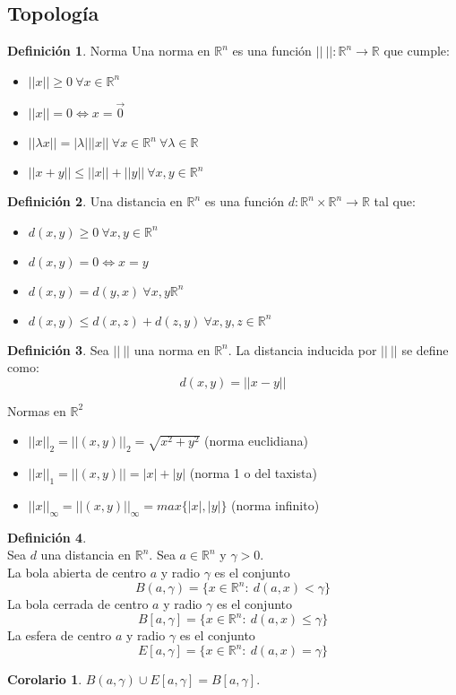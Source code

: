 \documentclass[10pt]{article}
\theoremstyle{definition}
\newtheorem{definition}{Definición}[section]
\newtheorem{corollary}{Corolario}[theorem]
\begin{document}
\subsection{Topología}
\begin{definition}{Norma}
	Una norma en $\mathbb{R}^n$ es una función $||\ ||:\mathbb{R}^n\to\mathbb{R}$ que cumple:
	\begin{itemize}
		\item $||x||\ge 0\ \forall x\in\mathbb{R}^n$
		\item $||x||=0\Leftrightarrow x=\vec{0}$
		\item $||\lambda x||=|\lambda|||x||\ \forall x\in\mathbb{R}^n\ \forall\lambda\in\mathbb{R}$
		\item $||x+y||\le ||x||+||y||\ \forall x,y\in\mathbb{R}^n$
	\end{itemize}
\end{definition}
\begin{definition}
	Una distancia en $\mathbb{R}^n$ es una función $d:\mathbb{R}^n\times\mathbb{R}^n\to\mathbb{R}$ tal que:
	\begin{itemize}
		\item $d(x,y)\ge 0\ \forall x,y\in\mathbb{R}^n$
		\item $d(x,y)=0\Leftrightarrow x=y$
		\item $d(x,y)=d(y,x)\ \forall x,y\mathbb{R}^n$
		\item $d(x,y)\le d(x,z)+d(z,y)\ \forall x,y,z\in\mathbb{R}^n$
	\end{itemize}
\end{definition}
\begin{definition}
	Sea $||\ ||$ una norma en $\mathbb{R}^n$. La distancia inducida por $||\ ||$ se define como: $$d(x,y)=||x-y||$$
\end{definition}
Normas en $\mathbb{R}^2$
\begin{itemize}
	\item $||x||_2=||(x,y)||_2=\sqrt{x^2+y^2}$ (norma euclidiana)
	\item $||x||_1=||(x,y)||=|x|+|y|$ (norma 1 o del taxista)
	\item $||x||_{\infty}=||(x,y)||_{\infty}=max\{|x|,|y|\}$ (norma infinito)
\end{itemize}
\begin{definition}{ \ }
	\\Sea $d$ una distancia en $\mathbb{R}^n$. Sea $a\in\mathbb{R}^n$ y $\gamma >0$.
	\\La bola abierta de centro $a$ y radio $\gamma$ es el conjunto $$B(a,\gamma)=\{x\in\mathbb{R}^n :\ d(a,x)<\gamma \}$$
	La bola cerrada de centro $a$ y radio $\gamma$ es el conjunto $$B[a,\gamma]=\{x\in\mathbb{R}^n :\ d(a,x)\le\gamma \}$$
	La esfera de centro $a$ y radio $\gamma$ es el conjunto $$E[a,\gamma]=\{x\in\mathbb{R}^n:\ d(a,x)=\gamma \}$$
\end{definition}
\begin{corollary}
	$B(a,\gamma) \cup E[a,\gamma]=B[a,\gamma]$.
\end{corollary}
\end{document}
